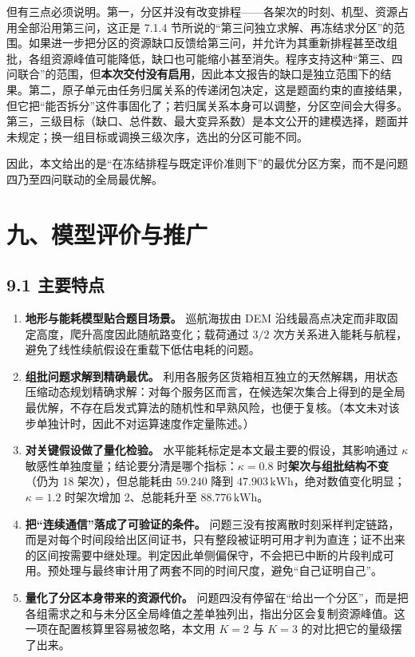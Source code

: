 \documentclass[withoutpreface,bwprint]{format}
\begin{document}
但有三点必须说明。第一，分区并没有改变排程——各架次的时刻、机型、资源占用全部沿用第三问，这正是 7.1.4 节所说的“第三问独立求解、再冻结求分区”的范围。如果进一步把分区的资源缺口反馈给第三问，并允许为其重新排程甚至改组批，各组资源峰值可能降低，缺口也可能缩小甚至消失。程序支持这种“第三、四问联合”的范围，但\textbf{本次交付没有启用}，因此本文报告的缺口是独立范围下的结果。第二，原子单元由任务归属关系的传递闭包决定，这是题面约束的直接结果，但它把“能否拆分”这件事固化了；若归属关系本身可以调整，分区空间会大得多。第三，三级目标（缺口、总件数、最大变异系数）是本文公开的建模选择，题面并未规定；换一组目标或调换三级次序，选出的分区可能不同。

因此，本文给出的是“在冻结排程与既定评价准则下”的最优分区方案，而不是问题四乃至四问联动的全局最优解。

\clearpage
\section{九、模型评价与推广}

\subsection{9.1 主要特点}
\begin{enumerate}[leftmargin=*]
    \item \textbf{地形与能耗模型贴合题目场景。} 巡航海拔由 DEM 沿线最高点决定而非取固定高度，爬升高度因此随航路变化；载荷通过 $3/2$ 次方关系进入能耗与航程，避免了线性续航假设在重载下低估电耗的问题。
    \item \textbf{组批问题求解到精确最优。} 利用各服务区货箱相互独立的天然解耦，用状态压缩动态规划精确求解：对每个服务区而言，在候选架次集合上得到的是全局最优解，不存在启发式算法的随机性和早熟风险，也便于复核。（本文未对该步单独计时，因此不对运算速度作定量陈述。）
    \item \textbf{对关键假设做了量化检验。} 水平能耗标定是本文最主要的假设，其影响通过 $\kappa$ 敏感性单独度量；结论要分清是哪个指标：$\kappa=0.8$ 时\textbf{架次与组批结构不变}（仍为 18 架次），但总能耗由 $59.240$ 降到 $47.903\,\text{kWh}$，绝对数值变化明显；$\kappa=1.2$ 时架次增加 2、总能耗升至 $88.776\,\text{kWh}$。
    \item \textbf{把“连续通信”落成了可验证的条件。} 问题三没有按离散时刻采样判定链路，而是对每个时间段给出区间证书，只有整段被证明可用才判为直连；证不出来的区间按需要中继处理。判定因此单侧偏保守，不会把已中断的片段判成可用。预处理与最终审计用了两套不同的时间尺度，避免“自己证明自己”。
    \item \textbf{量化了分区本身带来的资源代价。} 问题四没有停留在“给出一个分区”，而是把各组需求之和与未分区全局峰值之差单独列出，指出分区会复制资源峰值。这一项在配置核算里容易被忽略，本文用 $K=2$ 与 $K=3$ 的对比把它的量级摆了出来。
\end{enumerate}
\end{document}
